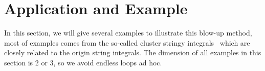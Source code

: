 \documentclass[12pt]{article}
\theoremstyle{definition}
\theoremstyle{plain}
\begin{document}
% 
% 
% 


\section{Application and Example}

In this section, we will give several examples to illustrate this blow-up method, most of examples comes from the so-called cluster stringy integrals~\cite{} which are closely related to the origin string integrals.
The dimension of all examples in this section is 2 or 3, so we avoid
endless loops ad hoc.
\end{document}
